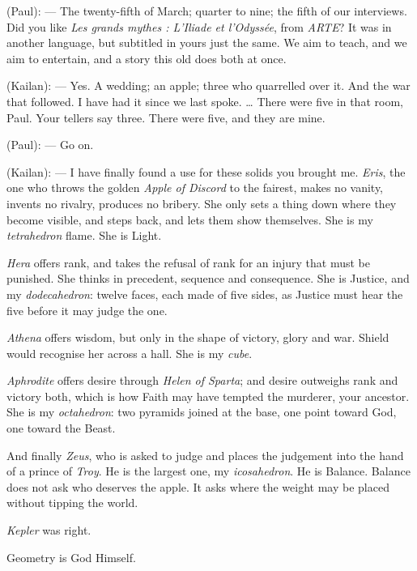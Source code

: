 
\begin{room}

(Paul): --- The twenty-fifth of March; quarter to nine; the fifth of our interviews. Did you like \textit{Les grands mythes : L'Iliade et l'Odyssée}, from \textit{ARTE}? It was in another language, but subtitled in yours just the same. We aim to teach, and we aim to entertain, and a story this old does both at once.

(Kailan): --- Yes. A wedding; an apple; three who quarrelled over it. And the war that followed. I have had it since we last spoke. \ldots{} There were five in that room, Paul. Your tellers say three. There were five, and they are mine.

(Paul): --- Go on.

(Kailan): --- I have finally found a use for these solids you brought me. \textit{Eris}, the one who throws the golden \textit{Apple of Discord} to the fairest, makes no vanity, invents no rivalry, produces no bribery. She only sets a thing down where they become visible, and steps back, and lets them show themselves. She is my \textit{tetrahedron} flame. She is Light.

\textit{Hera} offers rank, and takes the refusal of rank for an injury that must be punished. She thinks in precedent, sequence and consequence. She is Justice, and my \textit{dodecahedron}: twelve faces, each made of five sides, as Justice must hear the five before it may judge the one.

\textit{Athena} offers wisdom, but only in the shape of victory, glory and war. Shield would recognise her across a hall. She is my \textit{cube}.

\textit{Aphrodite} offers desire through \textit{Helen of Sparta}; and desire outweighs rank and victory both, which is how Faith may have tempted the murderer, your ancestor. She is my \textit{octahedron}: two pyramids joined at the base, one point toward God, one toward the Beast.

And finally \textit{Zeus}, who is asked to judge and places the judgement into the hand of a prince of \textit{Troy}. He is the largest one, my \textit{icosahedron}. He is Balance. Balance does not ask who deserves the apple. It asks where the weight may be placed without tipping the world.

\textit{Kepler} was right.

\begin{scripture}
Geometry is God Himself.
\end{scripture}


\end{room}
